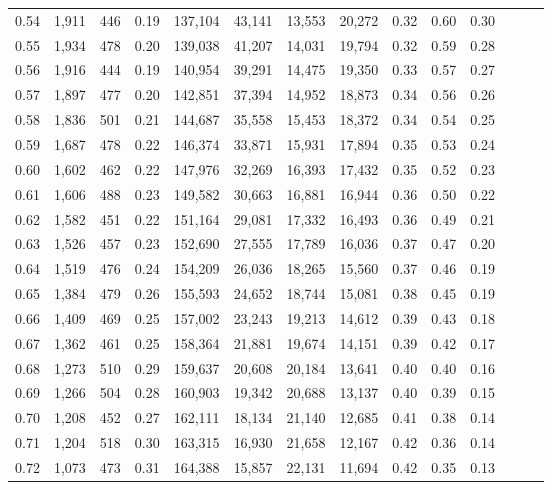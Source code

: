 \begin{tabular}{rrrrrrrrrrrrrr}
0.54 &  1,911 &  446 &  0.19 &  137,104 &   43,141 &  13,553 &  20,272 &  0.32 &  0.60 &      0.30 \\
0.55 &  1,934 &  478 &  0.20 &  139,038 &   41,207 &  14,031 &  19,794 &  0.32 &  0.59 &      0.28 \\
0.56 &  1,916 &  444 &  0.19 &  140,954 &   39,291 &  14,475 &  19,350 &  0.33 &  0.57 &      0.27 \\
0.57 &  1,897 &  477 &  0.20 &  142,851 &   37,394 &  14,952 &  18,873 &  0.34 &  0.56 &      0.26 \\
0.58 &  1,836 &  501 &  0.21 &  144,687 &   35,558 &  15,453 &  18,372 &  0.34 &  0.54 &      0.25 \\
0.59 &  1,687 &  478 &  0.22 &  146,374 &   33,871 &  15,931 &  17,894 &  0.35 &  0.53 &      0.24 \\
0.60 &  1,602 &  462 &  0.22 &  147,976 &   32,269 &  16,393 &  17,432 &  0.35 &  0.52 &      0.23 \\
0.61 &  1,606 &  488 &  0.23 &  149,582 &   30,663 &  16,881 &  16,944 &  0.36 &  0.50 &      0.22 \\
0.62 &  1,582 &  451 &  0.22 &  151,164 &   29,081 &  17,332 &  16,493 &  0.36 &  0.49 &      0.21 \\
0.63 &  1,526 &  457 &  0.23 &  152,690 &   27,555 &  17,789 &  16,036 &  0.37 &  0.47 &      0.20 \\
0.64 &  1,519 &  476 &  0.24 &  154,209 &   26,036 &  18,265 &  15,560 &  0.37 &  0.46 &      0.19 \\
0.65 &  1,384 &  479 &  0.26 &  155,593 &   24,652 &  18,744 &  15,081 &  0.38 &  0.45 &      0.19 \\
0.66 &  1,409 &  469 &  0.25 &  157,002 &   23,243 &  19,213 &  14,612 &  0.39 &  0.43 &      0.18 \\
0.67 &  1,362 &  461 &  0.25 &  158,364 &   21,881 &  19,674 &  14,151 &  0.39 &  0.42 &      0.17 \\
0.68 &  1,273 &  510 &  0.29 &  159,637 &   20,608 &  20,184 &  13,641 &  0.40 &  0.40 &      0.16 \\
0.69 &  1,266 &  504 &  0.28 &  160,903 &   19,342 &  20,688 &  13,137 &  0.40 &  0.39 &      0.15 \\
0.70 &  1,208 &  452 &  0.27 &  162,111 &   18,134 &  21,140 &  12,685 &  0.41 &  0.38 &      0.14 \\
0.71 &  1,204 &  518 &  0.30 &  163,315 &   16,930 &  21,658 &  12,167 &  0.42 &  0.36 &      0.14 \\
0.72 &  1,073 &  473 &  0.31 &  164,388 &   15,857 &  22,131 &  11,694 &  0.42 &  0.35 &      0.13 \\

\end{tabular}

